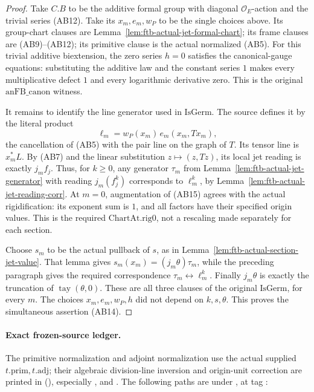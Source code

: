 \begin{proof}
Take \(C.B\) to be the additive formal group with diagonal
\(\mathcal O_E\)-action and the trivial series (AB12).
Take its \(x_m,e_m,w_P\) to be the single choices above.
Its group-chart clauses are
Lemma~\ref{lem:ftb-actual-jet-formal-chart};
its frame clauses are (AB9)--(AB12);
its primitive clause is the actual normalized (AB5).
For this trivial additive biextension, the zero series
\(h=0\) satisfies the canonical-gauge equations: substituting
the additive law and the constant series \(1\) makes every
multiplicative defect \(1\) and every logarithmic derivative
zero. This is the original \(\mathrm{anFB\_canon}\) witness.

It remains to identify the line generator used in
\(\mathrm{IsGerm}\).
The source defines it by the literal product
\[
                   \ell_m=w_P(x_m)\,e_m(x_m,Tx_m),        \tag{AB15}
\]
the cancellation of (AB5) with the pair line on the graph
of \(T\). Its tensor line is \(x_m^*L\).
By (AB7) and the linear substitution \(z\mapsto(z,Tz)\),
its local jet reading is exactly \(j_mf_j\).
Thus, for \(k\geq0\), any generator \(\tau_m\) from
Lemma~\ref{lem:ftb-actual-jet-generator} with reading
\(j_m(f_j^k)\) corresponds to \(\ell_m^k\), by
Lemma~\ref{lem:ftb-actual-jet-reading-corr}.
At \(m=0\), augmentation of (AB15) agrees with the actual
rigidification: its exponent sum is \(1\), and all factors
have their specified origin values. This is the required
\(\mathrm{ChartAt.rig0}\), not a rescaling made separately
for each section.

Choose \(s_m\) to be the actual pullback of \(s\), as in
Lemma~\ref{lem:ftb-actual-section-jet-value}.
That lemma gives
\(s_m(x_m)=(j_m\theta)\tau_m\), while the preceding paragraph
gives the required correspondence
\(\tau_m\longleftrightarrow\ell_m^k\).
Finally \(j_m\theta\) is exactly the truncation of
\(\operatorname{tay}(\theta,0)\).
These are all three clauses of the original
\(\mathrm{IsGerm}\), for every \(m\).
The choices \(x_m,e_m,w_P,h\) did not depend on \(k,s,\theta\).
This proves the simultaneous assertion (AB14).
\end{proof}

\paragraph{Exact frozen-source ledger.}
The primitive normalization and adjoint normalization use the
actual supplied \(t.\mathrm{prim},t.\mathrm{adj}\); their algebraic
division-line inversion and origin-unit correction are printed in
(),
especially ,  and
.
The following paths are under
,
at tag :

